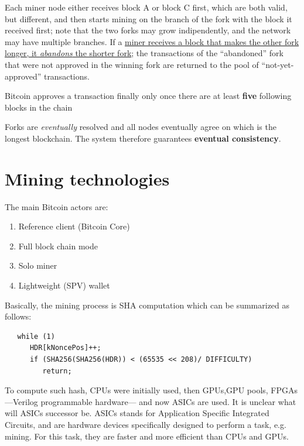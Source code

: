 Each miner node either receives block A or block C first, which are both valid, but different,
and then starts mining on the branch of the fork with the block it received first;
note that the two forks may grow indipendently, and the network may have multiple branches.
If a \ul{miner receives a block that makes the other fork longer, it \textit{abandons} the
shorter fork};
the transactions of the ``abandoned'' fork that were not approved in the winning fork are returned to the pool of ``not-yet-approved'' transactions.
\begin{definition}
   Bitcoin approves a transaction finally only once there are at least \textbf{five} following blocks in the chain 
\end{definition}


\begin{definition}
   Forks are \textit{eventually} resolved and all nodes eventually agree on which is the longest
   blockchain. The system therefore guarantees \textbf{eventual consistency}.
\end{definition}

\section{Mining technologies}
The main Bitcoin actors are:
\begin{enumerate}
   \item Reference client (Bitcoin Core)
   \item Full block chain mode
   \item Solo miner
   \item Lightweight (SPV) wallet
\end{enumerate}

Basically, the mining process is SHA computation which can be summarized as follows:
\begin{lstlisting}
   while (1)
      HDR[kNoncePos]++;
      if (SHA256(SHA256(HDR)) < (65535 << 208)/ DIFFICULTY)
         return;
\end{lstlisting}
To compute such hash, CPUs were initially used, then GPUs,GPU pools, FPGAs ---Verilog programmable hardware--- and now ASICs are used.
It is unclear what will ASICs successor be.
ASICs stands for Application Specific Integrated Circuits, and are hardware devices specifically designed to perform a task, e.g. mining.
For this task, they are faster and more efficient than CPUs and GPUs.

